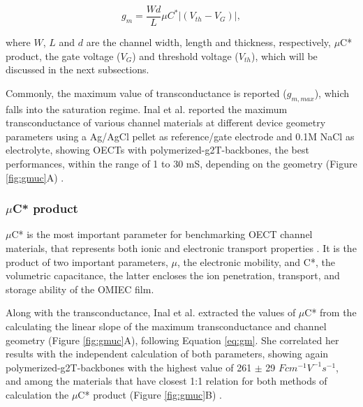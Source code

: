 \begin{equation}\label{eq:gm}
	g_{m} = \frac{Wd}{L} \mu C^{*} |(V_{th} - V_{G})|,
\end{equation}

where $W$, $L$ and $d$ are the channel width, length and thickness, respectively, $\mu$C* product, the gate voltage ($V_{G}$) and threshold voltage ($V_{th}$), which will be discussed in the next subsections.

Commonly, the maximum value of transconductance is reported ($g_{m,max}$), which falls into the saturation regime. Inal et al. reported the maximum transconductance of various channel materials at different device geometry parameters using a Ag/AgCl pellet as reference/gate electrode and 0.1M NaCl as electrolyte, showing OECTs with polymerized-g2T-backbones, the best performances, within the range of 1 to 30 mS, depending on the geometry (Figure \ref{fig:gmuc}A) \cite{inalBenchmarkingOrganicMixed2017}.

\subsubsection{$\mu$C* product}

$\mu$C* is the most important parameter for benchmarking OECT channel materials, that represents both ionic and electronic transport properties %
\cite{inalBenchmarkingOrganicMixed2017}. %
It is the product of two important parameters, $\mu$, the electronic mobility, and C*, the volumetric capacitance, the latter encloses the ion penetration, transport, and storage ability of the OMIEC film.

Along with the transconductance, Inal et al. extracted the values of $\mu$C* from the calculating the linear slope of the maximum transconductance and channel geometry (Figure \ref{fig:gmuc}A), following Equation \ref{eq:gm}. She correlated her results with the independent calculation of both parameters, showing again polymerized-g2T-backbones with the highest value of 261 $\pm$ 29 $Fcm^{-1}V^{-1}s^{-1}$,   and among the materials that have closest 1:1 relation for both methods of calculation the $\mu$C* product (Figure \ref{fig:gmuc}B) \cite{inalBenchmarkingOrganicMixed2017}.
 
